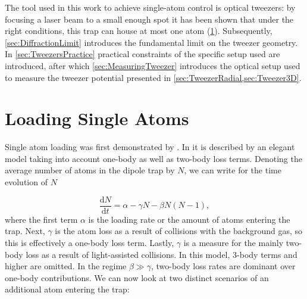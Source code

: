 The tool used in this work to achieve single-atom control is optical tweezers: by focusing a laser beam to a small enough spot it has been shown that under the right conditions, this trap can house at most one atom (\cref{sec:LoadingAtoms}).
Subsequently, \cref{sec:DiffractionLimit} introduces the fundamental limit on the tweezer geometry. 
In \cref{sec:TweezersPractice} practical constraints of the specific setup used are introduced, after which \cref{sec:MeasuringTweezer} introduces the optical setup used to measure the tweezer potential presented in \cref{sec:TweezerRadial,sec:Tweezer3D}.

\section{Loading Single Atoms}\label{sec:LoadingAtoms}

Single atom loading was first demonstrated by \cite{Schlosser2001}.
In \cite{Schlosser2002} it is described by an elegant model taking into account one-body as well as two-body loss terms. 
Denoting the average number of atoms in the dipole trap by $N$, we can write for the time evolution of $N$ \cite{Schlosser2002} 

\begin{equation}\label{LoadingTweezer}
	\frac{\text{d}N}{\text{d}t} = \alpha - \gamma N - \beta N(N-1),
\end{equation}
where the first term $\alpha$ is the loading rate or the amount of atoms entering the trap.
Next, $\gamma$ is the atom loss as a result of collisions with the background gas, so this is effectively a one-body loss term.
Lastly, $\gamma$ is a measure for the mainly two-body loss as a result of light-assisted collisions.
In this model, 3-body terms and higher are omitted.
In the regime $\beta \gg \gamma$, two-body loss rates are dominant over one-body contributions. 
We can now look at two distinct scenarios of an additional atom entering the trap:

